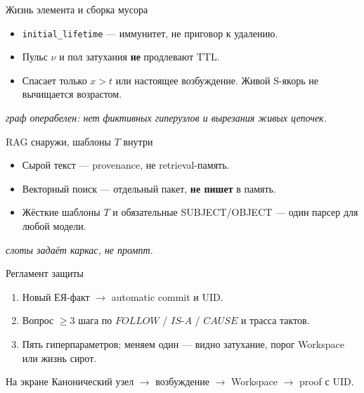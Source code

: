\documentclass[aspectratio=169,11pt]{beamer}
\newcommand{\Lift}[1]{%
  {\scriptsize\textit{#1}}%
}
\begin{document}
\begin{frame}{Жизнь элемента и сборка мусора}
\begin{itemize}
  \item \texttt{initial\_lifetime} --- иммунитет, не приговор к удалению.
  \item Пульс $\nu$ и пол затухания \textbf{не} продлевают TTL.
  \item Спасает только $x>t$ или настоящее возбуждение. Живой S-якорь не вычищается возрастом.
\end{itemize}
\vspace{0.4em}
\begin{center}
\end{center}
\Lift{граф операбелен: нет фиктивных гиперузлов и вырезания живых цепочек.}
\end{frame}

\begin{frame}{RAG снаружи, шаблоны $T$ внутри}
\begin{itemize}
  \item Сырой текст --- provenance, не retrieval-память.
  \item Векторный поиск --- отдельный пакет, \textbf{не пишет} в память.
  \item Жёсткие шаблоны $T$ и обязательные SUBJECT/OBJECT --- один парсер для любой модели.
\end{itemize}
\Lift{слоты задаёт каркас, не промпт.}
\end{frame}

\begin{frame}{Регламент защиты}
\begin{enumerate}
  \item Новый ЕЯ-факт $\to$ automatic commit и UID.
  \item Вопрос $\ge 3$ шага по $FOLLOW$ / $IS\text{-}A$ / $CAUSE$ и трасса тактов.
  \item Пять гиперпараметров; меняем один --- видно затухание, порог Workspace или жизнь сирот.
\end{enumerate}
\vspace{0.7em}
\begin{block}{На экране}
Канонический узел $\to$ возбуждение $\to$ Workspace $\to$ proof с UID.
\end{block}
\end{frame}
\end{document}
